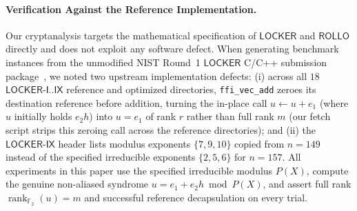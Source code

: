 \documentclass[11pt,a4paper]{article}
\theoremstyle{definition}
\theoremstyle{remark}
\newcommand{\Ftwo}{\mathbb{F}_2}
\newcommand{\rk}{\operatorname{rank}}
\begin{document}
\paragraph{Verification Against the Reference Implementation.}
Our cryptanalysis targets the mathematical specification of $\mathsf{LOCKER}$ and $\mathsf{ROLLO}$ directly and does not exploit any software defect. When generating benchmark instances from the unmodified NIST Round~1 $\mathsf{LOCKER}$ C/C++ submission package~\cite{LOCKER17}, we noted two upstream implementation defects: (i) across all $18$ $\mathsf{LOCKER\text{-}I..IX}$ reference and optimized directories, \texttt{ffi\_vec\_add} zeroes its destination reference before addition, turning the in-place call $u \leftarrow u + e_1$ (where $u$ initially holds $e_2 h$) into $u = e_1$ of rank $r$ rather than full rank $m$ (our fetch script strips this zeroing call across the reference directories); and (ii) the $\mathsf{LOCKER\text{-}IX}$ header lists modulus exponents $\{7, 9, 10\}$ copied from $n = 149$ instead of the specified irreducible exponents $\{2, 5, 6\}$ for $n = 157$. All experiments in this paper use the specified irreducible modulus $P(X)$, compute the genuine non-aliased syndrome $u = e_1 + e_2 h \bmod P(X)$, and assert full rank $\rk_{\Ftwo}(u) = m$ and successful reference decapsulation on every trial.
\end{document}
